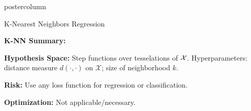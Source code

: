 \documentclass{beamer}
\begin{document}
\begin{frame}[fragile]{}
\begin{columns}
\begin{column}{.31\textwidth}
\begin{beamercolorbox}[center]{postercolumn}
\begin{minipage}{.98\textwidth}
{\begin{myblock}{K-Nearest Neighbors Regression}
  \begin{codebox}
  \textbf{K-NN Summary: }
  \end{codebox}
  \textbf{Hypothesis Space:} Step functions over tesselations of $\mathcal{X}$.
  Hyperparameters: distance measure $d(\cdot,\cdot)$ on $\mathcal X$; size of neighborhood $k$.
  
  \vspace*{1ex}
  
  \textbf{Risk:} Use any loss function for regression or classification.
  
  \vspace*{1ex}
  
  \textbf{Optimization:} Not applicable/necessary.
  
  \end{myblock}
}

\end{minipage}
\end{beamercolorbox}
\end{column}
\end{columns}
\end{frame}
\end{document}

